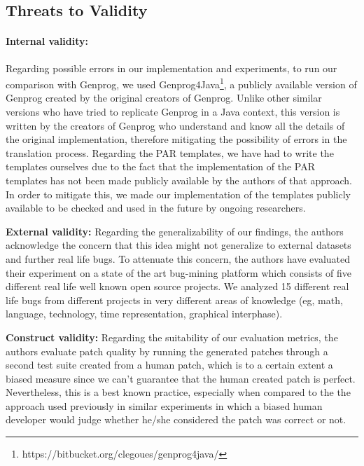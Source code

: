 \documentclass[conference]{IEEEtran}
\begin{document}
\subsection{Threats to Validity} \label{threatsVal}

\paragraph{Internal validity:}
Regarding possible errors in our implementation and experiments, to run our comparison with Genprog, we used Genprog4Java\footnote{https://bitbucket.org/clegoues/genprog4java/}, a publicly available version of Genprog created by the original creators of Genprog. Unlike other similar versions who have tried to replicate Genprog in a Java context, this version is written by the creators of Genprog who understand and know all the details of the original implementation, therefore mitigating the possibility of errors in the translation process. Regarding the PAR templates, we have had to write the templates ourselves due to the fact that the implementation of the PAR templates has not been made publicly available by the authors of that approach. In order to mitigate this, we made our implementation of the templates publicly available 
to be checked and used in the future by ongoing researchers.

\textbf{External validity:} 
Regarding the generalizability of our findings, the authors acknowledge the concern that this idea might not generalize to external datasets and further real life bugs. To attenuate this concern, the authors have evaluated their experiment on a state of the art bug-mining platform which consists of five different real life well known open source projects. We analyzed 15 different real life bugs from different projects in very different areas of knowledge (eg, math, language, technology, time representation, graphical interphase). 

\textbf{Construct validity:}
Regarding the suitability of our evaluation metrics, the authors evaluate patch quality by running the generated patches through a second test suite created from a human patch, which is to a certain extent a biased measure since we can't guarantee that the human created patch is perfect. Nevertheless, this is a best known practice, especially when compared to the the approach used previously in similar experiments in which a biased human developer would judge whether he/she considered the patch was correct or not.
\end{document}
